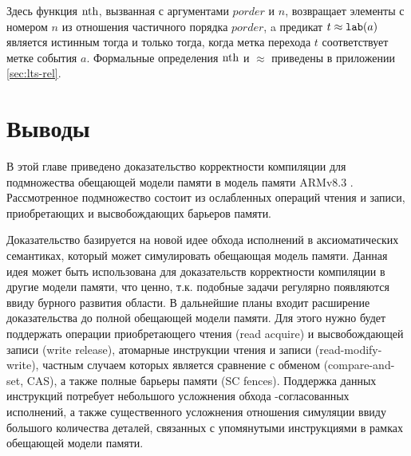  Здесь функция $\mathrm{nth}$, вызванная с аргументами $porder$ и $n$, возвращает
  элементы с номером $n$ из отношения частичного порядка $porder$, 
  a предикат $t \approx {\mathtt{lab}}(a)$ является истинным тогда и только тогда, когда метка перехода $t$
  соответствует метке события $a$.
  Формальные определения  $\mathrm{nth}$ и $\approx$ приведены в приложении \ref{sec:lts-rel}.
\section{Выводы}
В этой главе приведено доказательство корректности компиляции для подмножества
обещающей модели памяти \cite{Kang-al:POPL17} в модель памяти ARMv8.3 \cite{Pulte-al:POPL18}.
Рассмотренное подмножество состоит из ослабленных операций чтения и записи, приобретающих и высвобождающих барьеров памяти. 

Доказательство базируется на новой идее обхода исполнений в аксиоматических
семантиках, который может симулировать обещающая модель памяти. 
Данная идея может быть использована для доказательств
корректности компиляции в другие модели памяти, что ценно, т.к. подобные задачи регулярно появляются
ввиду бурного развития области.
В дальнейшие планы входит расширение доказательства
до полной обещающей модели памяти. Для этого нужно будет поддержать операции
приобретающего чтения (read acquire) и высвобождающей записи (write release),
атомарные инструкции чтения и записи (read-modify-write), частным случаем которых
является сравнение с обменом (compare-and-set, CAS), а также полные барьеры памяти (SC fences).
Поддержка данных инструкций потребует небольшого усложнения обхода \ARM-согласованных
исполнений, а также существенного усложнения отношения симуляции ввиду большого количества деталей,
связанных с упомянутыми инструкциями в рамках обещающей модели памяти.
